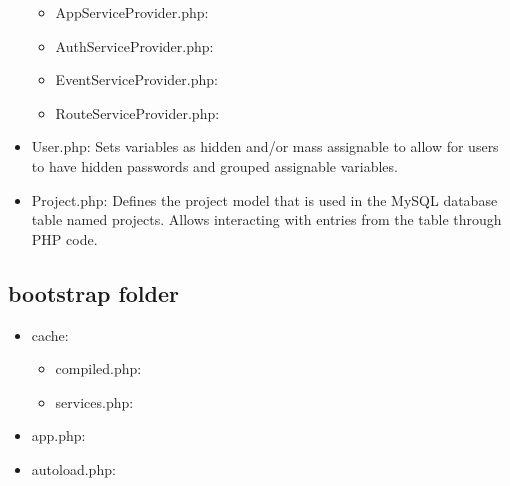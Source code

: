 \begin{itemize}
    \begin{itemize}
        \item AppServiceProvider.php: 
        \item AuthServiceProvider.php:
        \item EventServiceProvider.php:
        \item RouteServiceProvider.php: 
    \end{itemize}
    \item User.php: Sets variables as hidden and/or mass assignable to allow for users to have hidden passwords and grouped assignable variables.
    \item Project.php: Defines the project model that is used in the MySQL database table named projects. Allows interacting with entries from the table through PHP code.
\end{itemize}


\subsection{bootstrap folder}
\begin{itemize}
    \item cache: 
    \begin{itemize}
        \item compiled.php:
        \item services.php:
    \end{itemize}
    \item app.php: 
    \item autoload.php: 
\end{itemize}


